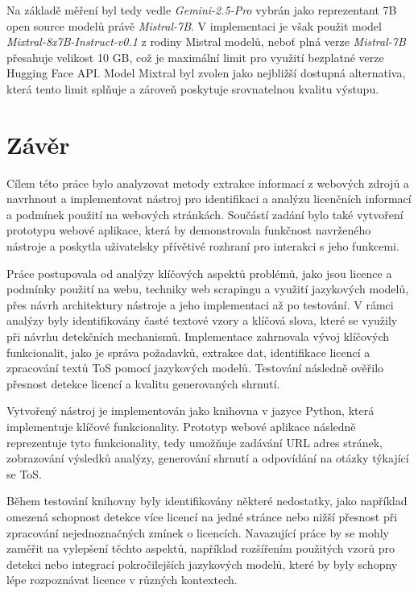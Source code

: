 Na základě měření byl tedy vedle \textit{Gemini-2.5-Pro} vybrán jako reprezentant 7B open source modelů právě \textit{Mistral-7B}.
V implementaci je však použit model \textit{Mixtral-8x7B-Instruct-v0.1} z rodiny Mistral modelů, neboť plná verze \textit{Mistral-7B} přesahuje velikost 10 GB, což je maximální limit pro využití bezplatné verze Hugging Face API.
Model Mixtral byl zvolen jako nejbližší dostupná alternativa, která tento limit splňuje a zároveň poskytuje srovnatelnou kvalitu výstupu.

\chapter*{Závěr}
Cílem této práce bylo analyzovat metody extrakce informací z webových zdrojů a navrhnout a implementovat nástroj pro identifikaci a analýzu licenčních informací a podmínek použití na webových stránkách.
Součástí zadání bylo také vytvoření prototypu webové aplikace, která by demonstrovala funkčnost navrženého nástroje a poskytla uživatelsky přívětivé rozhraní pro interakci s jeho funkcemi.

Práce postupovala od analýzy klíčových aspektů problémů, jako jsou licence a podmínky použití na webu, techniky web scrapingu a využití jazykových modelů, přes návrh architektury nástroje a jeho implementaci až po testování.
V rámci analýzy byly identifikovány časté textové vzory a klíčová slova, které se využily při návrhu detekčních mechanismů.
Implementace zahrnovala vývoj klíčových funkcionalit, jako je správa požadavků, extrakce dat, identifikace licencí a zpracování textů ToS pomocí jazykových modelů.
Testování následně ověřilo přesnost detekce licencí a kvalitu generovaných shrnutí.

Vytvořený nástroj je implementován jako knihovna v jazyce Python, která implementuje klíčové funkcionality.
Prototyp webové aplikace následně reprezentuje tyto funkcionality, tedy umožňuje zadávání URL adres stránek, zobrazování výsledků analýzy, generování shrnutí a odpovídání na otázky týkající se ToS.

Během testování knihovny byly identifikovány některé nedostatky, jako například omezená schopnost detekce více licencí na jedné stránce nebo nižší přesnost při zpracování nejednoznačných zmínek o licencích.
Navazující práce by se mohly zaměřit na vylepšení těchto aspektů, například rozšířením použitých vzorů pro detekci nebo integrací pokročilejších jazykových modelů, které by byly schopny lépe rozpoznávat licence v různých kontextech.

